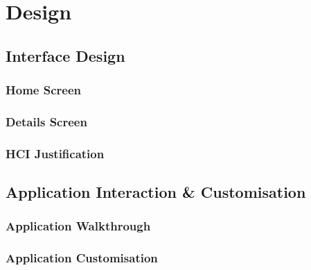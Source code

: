 \section{Design}

\subsection{Interface Design}

\subsubsection{Home Screen}

\subsubsection{Details Screen}

\subsubsection{HCI Justification}

\subsection{Application Interaction \& Customisation}

\subsubsection{Application Walkthrough}

\subsubsection{Application Customisation}


